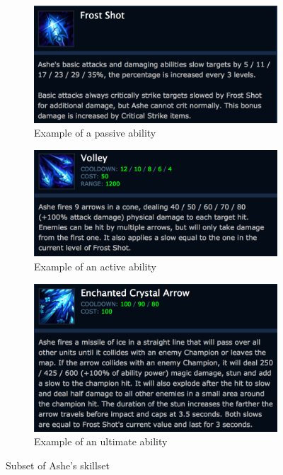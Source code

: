 \begin{figure}[!htb]
  \centering
  \begin{subfigure}[b]{0.49\textwidth}
    \includegraphics[width=\textwidth]{img/frostshot.png}
    \caption{Example of a passive ability}\label{fig:frostshot}
  \end{subfigure}
  \begin{subfigure}[b]{0.49\textwidth}
    \includegraphics[width=\textwidth]{img/volley.png}
    \caption{Example of an active ability}\label{fig:volley}
  \end{subfigure}
  \begin{subfigure}[b]{0.49\textwidth}
    \includegraphics[width=\textwidth]{img/enchanted.png}
    \caption{Example of an ultimate ability}\label{fig:enchanted}
  \end{subfigure}
  \caption{Subset of Ashe's skillset~\cite{ashe}}\label{fig:ashe}
\end{figure}

